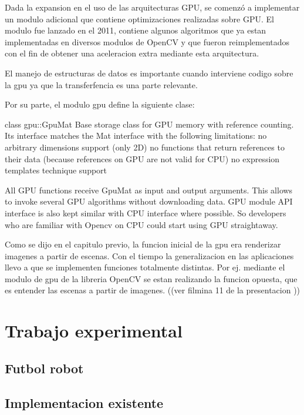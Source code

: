 \documentclass[a4paper,10pt]{report}
\begin{document}
Dada la expansion en el uso de las arquitecturas GPU, se comenzó a implementar un modulo adicional que contiene optimizaciones realizadas sobre GPU.
El modulo fue lanzado en el 2011, contiene algunos algoritmos que ya estan implementadas en diversos modulos de OpenCV y que fueron reimplementados con el fin de obtener una aceleracion extra mediante esta arquitectura.


El manejo de estructuras de datos es importante cuando interviene codigo sobre la gpu ya que la transferfencia es una parte relevante. 

Por su parte, el modulo gpu define la siguiente clase:

class gpu::GpuMat
Base storage class for GPU memory with reference counting. Its interface matches the Mat interface with the following limitations:
no arbitrary dimensions support (only 2D)
no functions that return references to their data (because references on GPU are not valid for CPU)
no expression templates technique support

All GPU functions receive GpuMat as input and output arguments. This allows to invoke several GPU algorithms without downloading data. GPU module API interface is also kept similar with CPU interface where possible. So developers who are familiar with Opencv on CPU could start using GPU straightaway.






Como se dijo en el capitulo previo, la funcion inicial de la gpu era renderizar imagenes a partir de escenas. Con el tiempo la generalizacion en las aplicaciones llevo a que se implementen funciones totalmente distintas. 
Por ej. mediante el modulo de gpu de la libreria OpenCV se estan realizando la funcion opuesta, que es entender las escenas a partir de imagenes. ((ver filmina 11 de la presentacion ))




\chapter{Trabajo experimental}
\section{Futbol robot}
\section{Implementacion existente}
\end{document}
